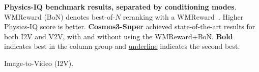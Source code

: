 \begin{table}[t]
    \centering
    \captionsetup{justification=raggedright, singlelinecheck=false}
    \caption{\textbf{Physics-IQ benchmark results, separated by conditioning modes}. WMReward (BoN) denotes best-of-$N$ reranking with a WMReward~\citep{yuan2026wmreward}. Higher Physics-IQ score is better. \textbf{Cosmos3-Super} achieved state-of-the-art results for both I2V and V2V, with and without using the WMReward+BoN. \textbf{Bold} indicates best in the column group and \underline{underline} indicates the second best.}
    \label{tab:physics_iq_results}
    \footnotesize
    \setlength{\tabcolsep}{4pt}
    \renewcommand{\arraystretch}{1.15}
    \begin{subtable}{0.48\linewidth}
        \centering
        \caption{Image-to-Video (I2V).}
        \label{tab:physics_iq_i2v}
    \end{subtable}
    \hfill
    \begin{subtable}{0.48\linewidth}
        \centering
        \caption{Video-to-Video (V2V).}
        \label{tab:physics_iq_v2v}

\end{subtable}
\end{table}
